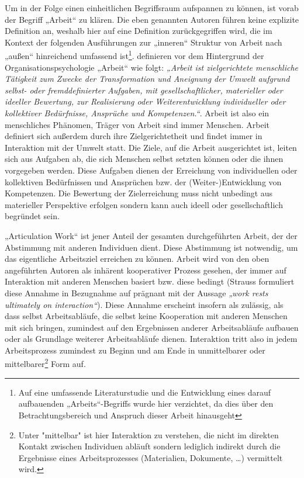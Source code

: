 Um in der Folge einen einheitlichen Begriffsraum aufspannen zu können, ist vorab der Begriff „Arbeit“ zu klären. Die eben genannten Autoren führen keine explizite Definition an, weshalb hier auf eine Definition zurückgegriffen wird, die im Kontext der folgenden Ausführungen zur „inneren“ Struktur von Arbeit nach „außen“ hinreichend umfassend ist\footnote{Auf eine umfassende Literaturstudie und die Entwicklung eines darauf aufbauenden „Arbeits“-Begriffs wurde hier verzichtet, da dies über den Betrachtungsbereich und Anspruch dieser Arbeit hinausgeht}. \citep{Semmer04} definieren vor dem Hintergrund der Organisationspsychologie „Arbeit“ wie folgt: \emph{„Arbeit ist zielgerichtete menschliche Tätigkeit zum Zwecke der Transformation und Aneignung der Umwelt aufgrund selbst- oder fremddefinierter Aufgaben, mit gesellschaftlicher, materieller oder ideeller Bewertung, zur Realisierung oder Weiterentwicklung individueller oder kollektiver Bedürfnisse, Ansprüche und Kompetenzen.“}. Arbeit ist also ein menschliches Phänomen, Träger von Arbeit sind immer Menschen. Arbeit definiert sich außerdem durch ihre Zielgerichtetheit und findet immer in Interaktion mit der Umwelt statt. Die Ziele, auf die Arbeit ausgerichtet ist, leiten sich aus Aufgaben ab, die sich Menschen selbst setzten können oder die ihnen vorgegeben werden. Diese Aufgaben dienen der Erreichung von individuellen oder kollektiven Bedürfnissen und Ansprüchen bzw. der (Weiter-)Entwicklung von Kompetenzen. Die Bewertung der Zielerreichung muss nicht unbedingt aus materieller Perspektive erfolgen sondern kann auch ideell oder gesellschaftlich begründet sein.

„Articulation Work“ ist jener Anteil der gesamten durchgeführten Arbeit, der der Abstimmung mit anderen Individuen dient. Diese Abstimmung ist notwendig, um das eigentliche Arbeitsziel erreichen zu können. Arbeit wird von den oben angeführten Autoren als inhärent kooperativer Prozess gesehen, der immer auf Interaktion mit anderen Menschen basiert bzw. diese bedingt (Strauss formuliert diese Annahme in Bezugnahme auf \citet{Hughes71} prägnant mit der Aussage \emph{„work rests ultimately on interaction“}). Diese Annahme erscheint insofern als zulässig, als dass selbst Arbeitsabläufe, die selbst keine Kooperation mit anderen Menschen mit sich bringen, zumindest auf den Ergebnissen anderer Arbeitsabläufe aufbauen oder als Grundlage weiterer Arbeitsabläufe dienen. Interaktion tritt also in jedem Arbeitsprozess zumindest zu Beginn und am Ende in unmittelbarer oder mittelbarer\footnote{Unter "mittelbar" ist hier Interaktion zu verstehen, die nicht im direkten Kontakt zwischen Individuen abläuft sondern lediglich indirekt durch die Ergebnisse eines Arbeitsprozesses (Materialien, Dokumente, \ldots) vermittelt wird.} Form auf.

